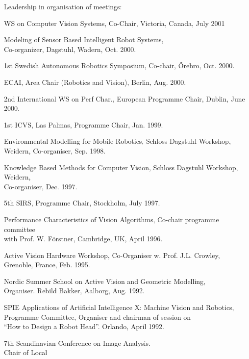 \documentclass{article}
\begin{document}
\begin{cv}
\begin{cvlist}{Leadership in organisation of meetings:}
\item WS on Computer Vision Systems, Co-Chair, Victoria,
  Canada,\cftdotfill{\cftdotsep} July 2001
\item Modeling of Sensor Based Intelligent Robot Systems,\\
  Co-organizer, Dagstuhl, Wadern, \cftdotfill{\cftdotsep} Oct. 2000.
\item 1st Swedish Autonomous Robotics Symposium, Co-chair, \"Orebro,
  \cftdotfill{\cftdotsep}Oct. 2000.
\item ECAI, Area Chair (Robotics and Vision), Berlin,
  \cftdotfill{\cftdotsep} Aug. 2000.
\item 2nd International WS on Perf Char., European Programme Chair,
  Dublin,\cftdotfill{\cftdotsep} June 2000.
\item 1st ICVS, Las Palmas, Programme Chair, \cftdotfill{\cftdotsep}
  Jan. 1999.
\item Environmental Modelling for Mobile Robotics, Schloss Dagstuhl
  Workshop,\\ Weidern, Co-organiser, \cftdotfill{\cftdotsep}
  Sep. 1998.
\item Knowledge Based Methods for Computer Vision, Schloss Dagstuhl
  Workshop, Weidern,\\ Co-organiser, \cftdotfill{\cftdotsep}
  Dec. 1997.
\item 5th SIRS, Programme Chair, Stockholm, \cftdotfill{\cftdotsep}
  July 1997.
\item Performance Characteristics of Vision Algorithms, Co-chair
  programme committee\\ with Prof. W. F\"orstner, Cambridge, UK,
  \cftdotfill{\cftdotsep} April 1996.
\item Active Vision Hardware Workshop, Co-Organiser w. Prof. J.L.
  Crowley, \\Grenoble, France,\cftdotfill{\cftdotsep} Feb. 1995.
\item Nordic Summer School on Active Vision and Geometric Modelling,
  \\ Organiser. Rebild Bakker, Aalborg, \cftdotfill{\cftdotsep}
  Aug. 1992.
\item SPIE Applications of Artificial Intelligence X: Machine Vision
  and Robotics, \\ Programme Committee, Organiser and chairman of
  session on\\ ``How to Design a Robot Head''. Orlando,
  \cftdotfill{\cftdotsep} April 1992.
\item 7th Scandinavian Conference on Image Analysis. \\Chair of Local

\end{cvlist}
\end{cv}
\end{document}
